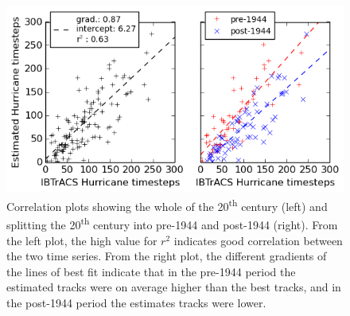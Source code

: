 \documentclass[pdftex,12pt,a4paper]{report}
\newcommand{\ts}{\textsuperscript}
\begin{document}
\begin{figure}[hb!]
    \centering
    \includegraphics[width=\textwidth]{figures/20th_century_corr}
    \caption{Correlation plots showing the whole of the 20\ts{th} century (left) and splitting the
    20\ts{th} century into pre-1944 and post-1944 (right). From the left plot, the high value for
    $r^2$ indicates good correlation between the two time series. From the right plot, the different
    gradients of the lines of best fit indicate that in the pre-1944 period the estimated tracks
    were on average higher than the best tracks, and in the post-1944 period the estimates tracks were
    lower. }
    \label{fig:20th_century_hurricane_corr}
\end{figure}

\newpage
\end{document}
